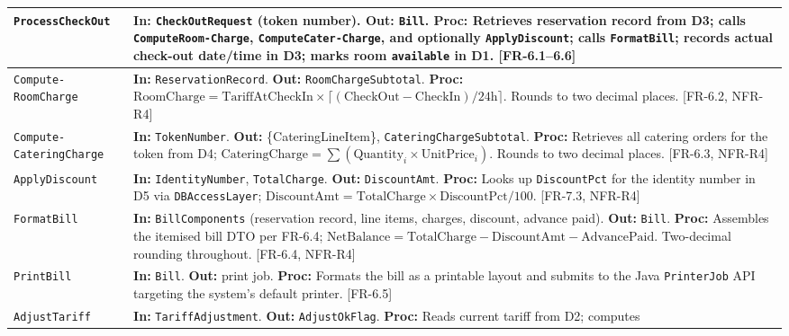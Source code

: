 \documentclass[12pt,a4paper]{article}
\begin{document}
\begin{longtable}{|L{3.2cm}|L{10.5cm}|}
  \hline
  \texttt{ProcessCheckOut}
    & \textbf{In:} \texttt{CheckOutRequest} (token number). \textbf{Out:} \texttt{Bill}.
      \textbf{Proc:} Retrieves reservation record from D3; calls
      \texttt{ComputeRoom-Charge}, \texttt{ComputeCater-Charge}, and optionally
      \texttt{ApplyDiscount}; calls \texttt{FormatBill}; records actual check-out
      date/time in D3; marks room \texttt{available} in D1. [FR-6.1--6.6] \\
  \hline
  \texttt{Compute-
  RoomCharge}
    & \textbf{In:} \texttt{ReservationRecord}. \textbf{Out:} \texttt{RoomChargeSubtotal}.
      \textbf{Proc:} $\text{RoomCharge} = \text{TariffAtCheckIn} \times
      \lceil(\text{CheckOut} - \text{CheckIn})/24\text{h}\rceil$.
      Rounds to two decimal places. [FR-6.2, NFR-R4] \\
  \hline
  \texttt{Compute-
  CateringCharge}
    & \textbf{In:} \texttt{TokenNumber}. \textbf{Out:} \{CateringLineItem\}, \texttt{CateringChargeSubtotal}.
      \textbf{Proc:} Retrieves all catering orders for the token from D4;
      $\text{CateringCharge} = \sum (\text{Quantity}_i \times \text{UnitPrice}_i)$.
      Rounds to two decimal places. [FR-6.3, NFR-R4] \\
  \hline
  \texttt{ApplyDiscount}
    & \textbf{In:} \texttt{IdentityNumber}, \texttt{TotalCharge}.
      \textbf{Out:} \texttt{DiscountAmt}.
      \textbf{Proc:} Looks up \texttt{DiscountPct} for the identity number in D5 via
      \texttt{DBAccessLayer};
      $\text{DiscountAmt} = \text{TotalCharge} \times \text{DiscountPct} / 100$.
      [FR-7.3, NFR-R4] \\
  \hline
  \texttt{FormatBill}
    & \textbf{In:} \texttt{BillComponents} (reservation record, line items, charges,
      discount, advance paid). \textbf{Out:} \texttt{Bill}.
      \textbf{Proc:} Assembles the itemised bill DTO per FR-6.4;
      $\text{NetBalance} = \text{TotalCharge} - \text{DiscountAmt} - \text{AdvancePaid}$.
      Two-decimal rounding throughout. [FR-6.4, NFR-R4] \\
  \hline
  \texttt{PrintBill}
    & \textbf{In:} \texttt{Bill}. \textbf{Out:} print job.
      \textbf{Proc:} Formats the bill as a printable layout and submits to the Java
      \texttt{PrinterJob} API targeting the system's default printer. [FR-6.5] \\
  \hline
  \texttt{AdjustTariff}
    & \textbf{In:} \texttt{TariffAdjustment}. \textbf{Out:} \texttt{AdjustOkFlag}.
      \textbf{Proc:} Reads current tariff from D2; computes

\end{longtable}
\end{document}
